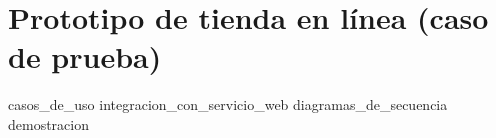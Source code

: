 %
%
%

\section{Prototipo de tienda en línea (caso de prueba)}

{casos_de_uso}
{integracion_con_servicio_web}
{diagramas_de_secuencia}
{demostracion}

